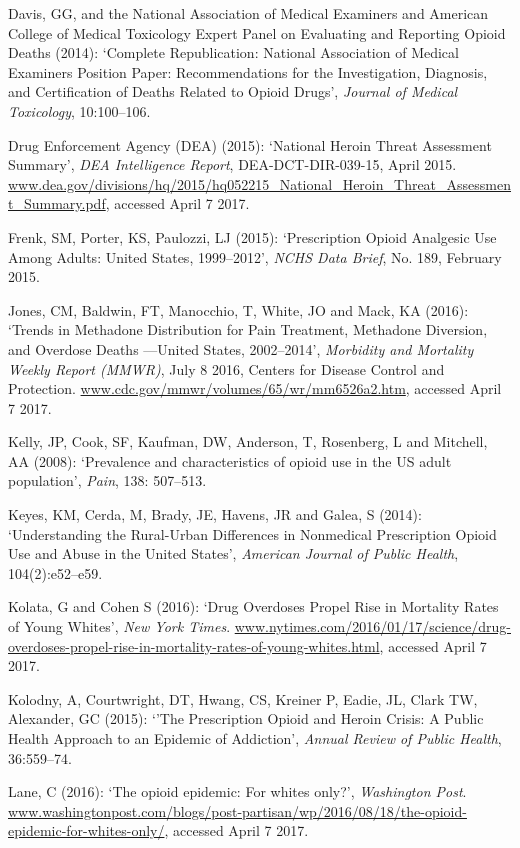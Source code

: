 \documentclass[12pt, a4paper]{article}
\begin{document}
\begin{description}
\item Davis, GG, and the National Association of Medical Examiners and American College of Medical Toxicology Expert Panel on Evaluating
and Reporting Opioid Deaths (2014): `Complete Republication: National Association of Medical Examiners Position Paper: Recommendations for the Investigation, Diagnosis, and Certification of Deaths Related to Opioid Drugs', \textit{Journal of Medical Toxicology}, 10:100--106.
\item Drug Enforcement Agency (DEA) (2015): `National Heroin Threat Assessment Summary', \textit{DEA Intelligence Report}, DEA-DCT-DIR-039-15, April 2015. \\\url{www.dea.gov/divisions/hq/2015/hq052215_National_Heroin_Threat_Assessment_Summary.pdf}, accessed April 7 2017.
\item Frenk, SM, Porter, KS, Paulozzi, LJ (2015): `Prescription Opioid Analgesic Use Among Adults: United States, 1999--2012', \textit{NCHS Data Brief}, No. 189, February 2015. 
\item Jones, CM, Baldwin, FT, Manocchio, T, White, JO and Mack, KA (2016): `Trends in Methadone Distribution for Pain Treatment, Methadone Diversion, and Overdose Deaths ---United States, 2002--2014', \textit{Morbidity and Mortality Weekly Report (MMWR)}, July 8 2016, Centers for Disease Control and Protection. \url{www.cdc.gov/mmwr/volumes/65/wr/mm6526a2.htm}, accessed April 7 2017.
\item Kelly, JP, Cook, SF, Kaufman, DW, Anderson, T, Rosenberg, L and Mitchell, AA (2008): `Prevalence and characteristics of opioid use in the US adult population', \textit{Pain}, 138: 507--513.
\item Keyes, KM, Cerda, M, Brady, JE, Havens, JR and Galea, S (2014): `Understanding the Rural-Urban Differences in Nonmedical Prescription Opioid Use and Abuse in the United States', \textit{American Journal of Public Health}, 104(2):e52--e59.
\item Kolata, G and Cohen S (2016): `Drug Overdoses Propel Rise in Mortality Rates of Young Whites', \textit{New York Times}. \url{www.nytimes.com/2016/01/17/science/drug-overdoses-propel-rise-in-mortality-rates-of-young-whites.html},  accessed April 7 2017.
\item Kolodny, A, Courtwright, DT, Hwang, CS, Kreiner P, Eadie, JL, Clark TW, Alexander, GC (2015): `'The Prescription Opioid and Heroin Crisis: A Public Health Approach to an Epidemic of Addiction', \textit{Annual Review of Public Health}, 36:559--74.
\item Lane, C (2016): `The opioid epidemic: For whites only?', \textit{Washington Post}. \url{www.washingtonpost.com/blogs/post-partisan/wp/2016/08/18/the-opioid-epidemic-for-whites-only/},  accessed April 7 2017. 

\end{description}
\end{document}
